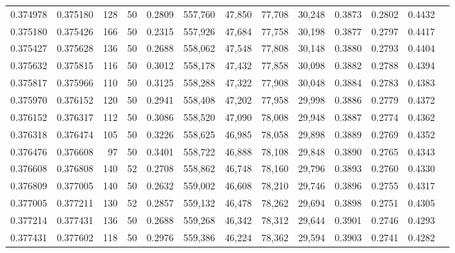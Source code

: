 \begin{tabular}{rrrrrrrrrrrrr}
0.374978 & 0.375180 &   128 &  50 &                                     0.2809 & 557,760 &  47,850 &  77,708 &  30,248 & 0.3873 & 0.2802 & 0.4432 \\
0.375180 & 0.375426 &   166 &  50 &                                     0.2315 & 557,926 &  47,684 &  77,758 &  30,198 & 0.3877 & 0.2797 & 0.4417 \\
0.375427 & 0.375628 &   136 &  50 &                                     0.2688 & 558,062 &  47,548 &  77,808 &  30,148 & 0.3880 & 0.2793 & 0.4404 \\
0.375632 & 0.375815 &   116 &  50 &                                     0.3012 & 558,178 &  47,432 &  77,858 &  30,098 & 0.3882 & 0.2788 & 0.4394 \\
0.375817 & 0.375966 &   110 &  50 &                                     0.3125 & 558,288 &  47,322 &  77,908 &  30,048 & 0.3884 & 0.2783 & 0.4383 \\
0.375970 & 0.376152 &   120 &  50 &                                     0.2941 & 558,408 &  47,202 &  77,958 &  29,998 & 0.3886 & 0.2779 & 0.4372 \\
0.376152 & 0.376317 &   112 &  50 &                                     0.3086 & 558,520 &  47,090 &  78,008 &  29,948 & 0.3887 & 0.2774 & 0.4362 \\
0.376318 & 0.376474 &   105 &  50 &                                     0.3226 & 558,625 &  46,985 &  78,058 &  29,898 & 0.3889 & 0.2769 & 0.4352 \\
0.376476 & 0.376608 &    97 &  50 &                                     0.3401 & 558,722 &  46,888 &  78,108 &  29,848 & 0.3890 & 0.2765 & 0.4343 \\
0.376608 & 0.376808 &   140 &  52 &                                     0.2708 & 558,862 &  46,748 &  78,160 &  29,796 & 0.3893 & 0.2760 & 0.4330 \\
0.376809 & 0.377005 &   140 &  50 &                                     0.2632 & 559,002 &  46,608 &  78,210 &  29,746 & 0.3896 & 0.2755 & 0.4317 \\
0.377005 & 0.377211 &   130 &  52 &                                     0.2857 & 559,132 &  46,478 &  78,262 &  29,694 & 0.3898 & 0.2751 & 0.4305 \\
0.377214 & 0.377431 &   136 &  50 &                                     0.2688 & 559,268 &  46,342 &  78,312 &  29,644 & 0.3901 & 0.2746 & 0.4293 \\
0.377431 & 0.377602 &   118 &  50 &                                     0.2976 & 559,386 &  46,224 &  78,362 &  29,594 & 0.3903 & 0.2741 & 0.4282 \\

\end{tabular}
